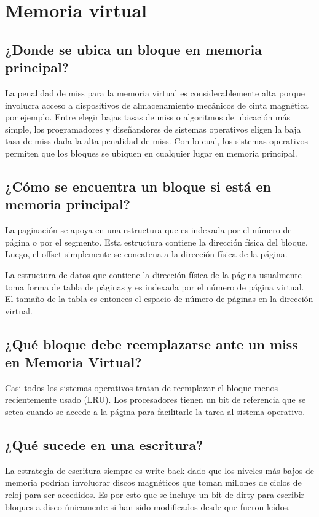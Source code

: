 \section{Memoria virtual}

\subsection{¿Donde se ubica un bloque en memoria principal?}
La penalidad de miss para la memoria virtual es considerablemente alta porque involucra acceso a dispositivos de almacenamiento mecánicos de cinta magnética por ejemplo. Entre elegir bajas tasas de miss o algoritmos de ubicación más simple, los programadores y diseñandores de sistemas operativos eligen la baja tasa de miss dada la alta penalidad de miss. Con lo cual, los sistemas operativos permiten que los bloques se ubiquen en cualquier lugar en memoria principal.


\subsection{¿Cómo se encuentra un bloque si está en memoria principal?}
La paginación se apoya en una estructura que es indexada por el número de página o por el segmento. Esta estructura contiene la dirección física del bloque. Luego, el offset simplemente se concatena a la dirección física de la página.

La estructura de datos que contiene la dirección física de la página usualmente toma forma de tabla de páginas y es indexada por el número de página virtual. El tamaño de la tabla es entonces el espacio de número de páginas en la dirección virtual.

\subsection{¿Qué bloque debe reemplazarse ante un miss en Memoria Virtual?}
Casi todos los sistemas operativos tratan de reemplazar el bloque menos recientemente usado (LRU). Los procesadores tienen un bit de referencia que se setea cuando se accede a la página para facilitarle la tarea al sistema operativo.

\subsection{¿Qué sucede en una escritura?}
La estrategia de escritura siempre es write-back dado que los niveles más bajos de memoria podrían involucrar discos magnéticos que toman millones de ciclos de reloj para ser accedidos. Es por esto que se incluye un bit de dirty para escribir bloques a disco únicamente si han sido modificados desde que fueron leídos.


